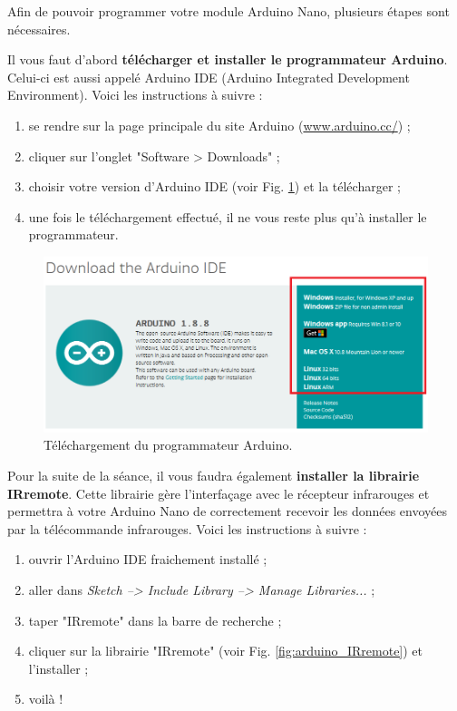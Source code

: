 Afin de pouvoir programmer votre module Arduino Nano, plusieurs étapes sont nécessaires.

Il vous faut d'abord \textbf{télécharger et installer le programmateur Arduino}. Celui-ci est aussi appelé Arduino IDE (Arduino Integrated Development Environment). Voici les instructions à suivre :
\begin{enumerate}
	\item se rendre sur la page principale du site Arduino (\url{www.arduino.cc/}) ;
	\item cliquer sur l'onglet "Software > Downloads" ; 
	\item choisir votre version d'Arduino IDE (voir Fig. \ref{fig:arduino_ide}) et la télécharger ;
	\item une fois le téléchargement effectué, il ne vous reste plus qu'à installer le programmateur.
\end{enumerate}

\begin{figure}[ht!]
	\centering
	\includegraphics[width=\textwidth]{imgs/arduino_ide.png}
	\caption{Téléchargement du programmateur Arduino.}
	\label{fig:arduino_ide}
\end{figure}

Pour la suite de la séance, il vous faudra également \textbf{installer la librairie IRremote}. Cette librairie gère l'interfaçage avec le récepteur infrarouges et permettra à votre Arduino Nano de correctement recevoir les données envoyées par la télécommande infrarouges. Voici les instructions à suivre :
\begin{enumerate}
	\item ouvrir l'Arduino IDE fraichement installé ;
	\item aller dans \textit{Sketch --> Include Library --> Manage Libraries...} ;
	\item taper "IRremote" dans la barre de recherche ;
	\item cliquer sur la librairie "IRremote" (voir Fig. \ref{fig:arduino_IRremote}) et l'installer ;
	\item voilà ! 
\end{enumerate}

